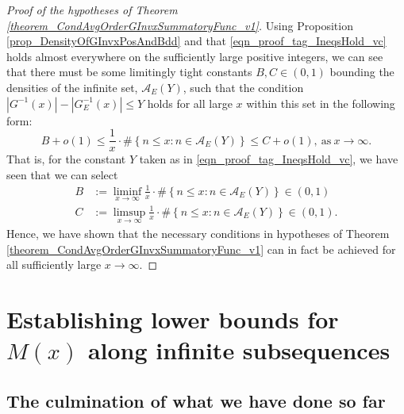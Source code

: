 \documentclass[11pt,reqno,a4letter]{article}
\numberwithin{figure}{section}
\numberwithin{table}{section}
\theoremstyle{plain}
\numberwithin{theorem}{section}
\theoremstyle{definition}
\begin{document}
\begin{proof}[Proof of the hypotheses of Theorem \ref{theorem_CondAvgOrderGInvxSummatoryFunc_v1}]
Using Proposition \ref{prop_DensityOfGInvxPosAndBdd} and that 
\eqref{eqn_proof_tag_IneqsHold_vc} holds almost everywhere on the sufficiently large 
positive integers, 
we can see that there must be some limitingly tight constants 
$B, C \in (0, 1)$ bounding the densities of the infinite set, $\mathcal{A}_E(Y)$, such that the condition 
$|G^{-1}(x)| - |G_E^{-1}(x)| \leq Y$ holds for all large $x$ within this set in the following form: 
\[
B + o(1) \leq \frac{1}{x} \cdot \#\left\{n \leq x: n \in \mathcal{A}_E(Y)\right\} \leq C + o(1), 
     \mathrm{\ as\ } x \rightarrow \infty. 
\] 
That is, for the constant $Y$ taken as in \eqref{eqn_proof_tag_IneqsHold_vc}, 
we have seen that we can select 
\begin{align*} 
B & := \liminf_{x \rightarrow \infty} \frac{1}{x} \cdot \#\left\{n \leq x: n \in \mathcal{A}_E(Y)\right\} \in (0, 1) \\ 
C & := \limsup_{x \rightarrow \infty} \frac{1}{x} \cdot \#\left\{n \leq x: n \in \mathcal{A}_E(Y)\right\} \in (0, 1). 
\end{align*} 
Hence, we have shown that the necessary conditions in hypotheses of 
Theorem \ref{theorem_CondAvgOrderGInvxSummatoryFunc_v1} can in fact be achieved for all 
sufficiently large $x \rightarrow \infty$. 
\end{proof} 

\newpage
\section{Establishing lower bounds for $M(x)$ along infinite subsequences} 
\label{Section_KeyApplications} 

\subsection{The culmination of what we have done so far} 
\end{document}
